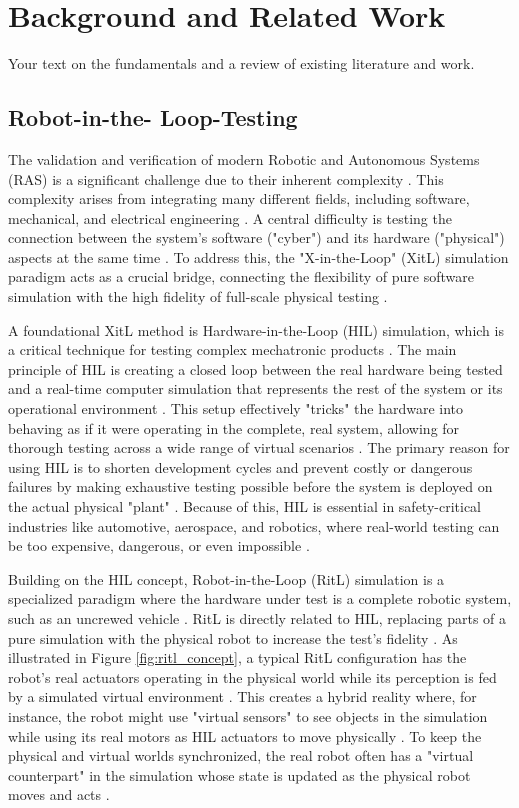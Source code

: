 \chapter{Background and Related Work}
\label{chap:background}
Your text on the fundamentals and a review of existing literature and work.

\section{Robot-in-the-
Loop-Testing}
\label{sec:RitL}
The validation and verification of modern Robotic and Autonomous Systems (RAS) is a significant challenge due to their inherent complexity \cite{AMV23}. This complexity arises from integrating many different fields, including software, mechanical, and electrical engineering \cite{AMV23}. A central difficulty is testing the connection between the system's software ("cyber") and its hardware ("physical") aspects at the same time \cite{AMV23}. To address this, the "X-in-the-Loop" (XitL) simulation paradigm acts as a crucial bridge, connecting the flexibility of pure software simulation with the high fidelity of full-scale physical testing \cite{Brayanov2019}.

A foundational XitL method is Hardware-in-the-Loop (HIL) simulation, which is a critical technique for testing complex mechatronic products \cite{Mihalic2022, Brayanov2019}. The main principle of HIL is creating a closed loop between the real hardware being tested and a real-time computer simulation that represents the rest of the system or its operational environment \cite{Mihalic2022}. This setup effectively "tricks" the hardware into behaving as if it were operating in the complete, real system, allowing for thorough testing across a wide range of virtual scenarios \cite{Brayanov2019}. The primary reason for using HIL is to shorten development cycles and prevent costly or dangerous failures by making exhaustive testing possible before the system is deployed on the actual physical "plant" \cite{Mihalic2022}. Because of this, HIL is essential in safety-critical industries like automotive, aerospace, and robotics, where real-world testing can be too expensive, dangerous, or even impossible \cite{Brayanov2019}.

Building on the HIL concept, Robot-in-the-Loop (RitL) simulation is a specialized paradigm where the hardware under test is a complete robotic system, such as an uncrewed vehicle \cite{Mihalic2022}. RitL is directly related to HIL, replacing parts of a pure simulation with the physical robot to increase the test's fidelity \cite{Hu05}. As illustrated in Figure \ref{fig:ritl_concept}, a typical RitL configuration has the robot's real actuators operating in the physical world while its perception is fed by a simulated virtual environment \cite{Hu05, Mihalic2022}. This creates a hybrid reality where, for instance, the robot might use "virtual sensors" to see objects in the simulation while using its real motors as HIL actuators to move physically \cite{Hu05}. To keep the physical and virtual worlds synchronized, the real robot often has a "virtual counterpart" in the simulation whose state is updated as the physical robot moves and acts \cite{Hu05}.

